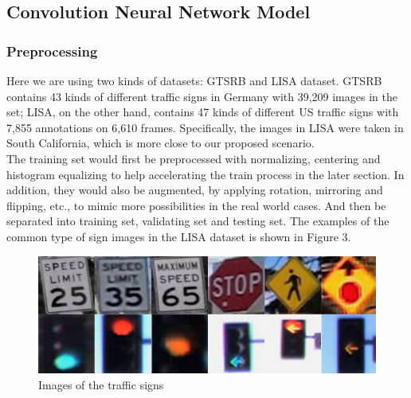 \documentclass{article}
\begin{document}
\subsection{Convolution Neural Network Model}
\subsubsection{Preprocessing}
Here we are using two kinds of datasets: GTSRB and LISA dataset. GTSRB contains 43 kinds of different traffic signs in Germany with 39,209 images in the set; LISA, on the other hand, contains 47 kinds of different US traffic signs with 7,855 annotations on 6,610 frames. Specifically, the images in LISA were taken in South California, which is more close to our proposed scenario.\\
The training set would first be preprocessed with normalizing, centering and histogram equalizing to help accelerating the train process in the later section. In addition, they would also be augmented, by applying rotation, mirroring and flipping, etc., to mimic more possibilities in the real world cases. And then be separated into training set, validating set and testing set. The examples of the common type of sign images in the LISA dataset is shown in Figure 3.

\begin{figure}
  \centering
  \begin{minipage}{.6\textwidth}
    \includegraphics[width=1.0\linewidth]{dataset3.jpg}
    \caption{Images of the traffic signs}
    \label{fig:fig_3}
  \end{minipage}
\end{figure}
\end{document}
